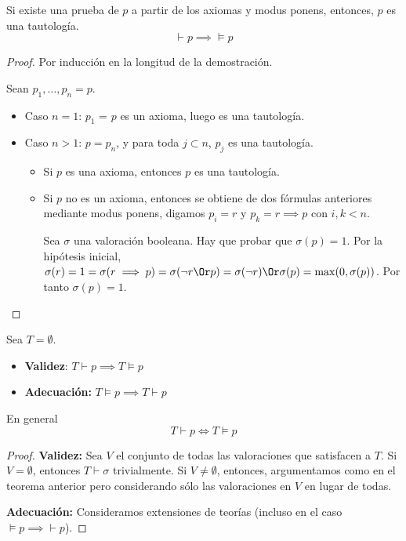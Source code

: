 \begin{theorem}
	Si existe una prueba de $p$ a partir de los axiomas y modus ponens, entonces, $p$ es una tautología.
	$$\vdash p \implies \vDash p$$
\end{theorem}
\begin{proof}
	Por inducción en la longitud de la demostración. 
	
	Sean $p_1,\hdots, p_n=p$.
	\begin{itemize}
		\item Caso $n=1$: $p_1$ = $p$ es un axioma, luego es una tautología.
		\item Caso $n>1$: $p=p_n$, y para toda $j\subset n$, $p_j$ es una tautología.
		\begin{itemize}
			\item Si $p$ es una axioma, entonces $p$ es una tautología.
			\item Si $p$ no es un axioma, entonces se obtiene de dos fórmulas anteriores mediante modus ponens, digamos $p_i = r$ y $p_k=r\implies p$ con $i,k<n$. 
			
			Sea $\sigma$ una valoración booleana. Hay que probar que $\sigma(p) = 1$. Por la hipótesis inicial, $\sigma(r) = 1 = \sigma(r\implies p) = \sigma(\neg r \Or p) = \sigma(\neg r) \Or \sigma(p) = \max(0,\sigma(p))$.
			Por tanto $\sigma(p) = 1$.
		\end{itemize}
	\end{itemize}
\end{proof}

\begin{theorem}	Sea $T = \emptyset$.
	\begin{itemize}
		\item \textbf{Validez}: 
		$T \vdash p \implies T \vDash p$
		\item \textbf{Adecuación:}
		$T \vDash p \implies T \vdash p$
	\end{itemize}
	En general $$T\vdash p \iff T\vDash p$$
\end{theorem}
\begin{proof}
	
	\textbf{Validez:} Sea $V$ el conjunto de todas las valoraciones que satisfacen a $T$. Si $V=\emptyset$, entonces $T\vdash \sigma$ trivialmente. Si $V\neq \emptyset$, entonces, argumentamos como en el teorema anterior pero considerando sólo las valoraciones en $V$ en lugar de todas.
	
	\textbf{Adecuación:} Consideramos extensiones de teorías (incluso en el caso $\vDash p \implies \vdash p$).
	
\end{proof}

